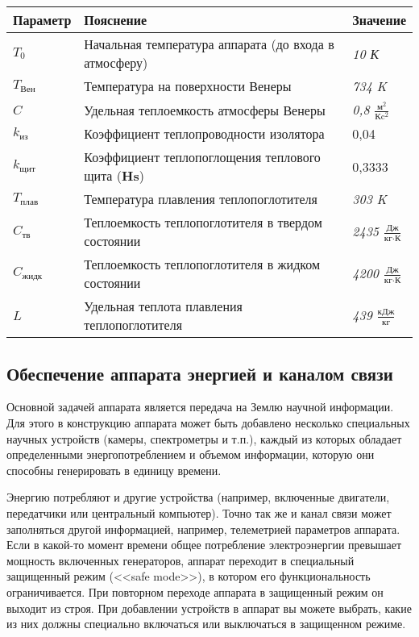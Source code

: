 \documentclass[12pt,a4paper]{article}
\begin{document}
\begin{center}
\begin{tabular}{ |p{2cm}|p{8cm}|p{3cm}| } 
  \hline
  \textbf{Параметр} & \textbf{Пояснение} & \textbf{Значение} \\
  \hline
  $ T_0 $ & Начальная температура аппарата (до входа в атмосферу) & \emph{10 К} \\
  \hline
  $ T_{\text{Вен}} $ & Температура на поверхности Венеры & \emph{734 K} \\
  \hline
  $ C $ & Удельная теплоемкость атмосферы Венеры & \emph{0,8 $\frac{\text{м}^2}{\text{К}
      \text{c}^2}$} \\
  \hline
  $ k_{\text{из}} $ & Коэффициент теплопроводности изолятора & 0,04\\
  \hline
  $ k_{\text{щит}} $ & Коэффициент теплопоглощения теплового щита (\textbf{Hs}) & 0,3333\\
  \hline
  $ T_{\text{плав}} $ & Температура плавления теплопоглотителя & \emph{303 K}\\
  \hline
  $ C_{\text{тв}}$ & Теплоемкость теплопоглотителя в твердом состоянии & \emph{2435
    $\frac{\text{Дж}}{\text{кг} \cdot \text{К}}$}\\
  \hline
  $ C_{\text{жидк}}$ & Теплоемкость теплопоглотителя в жидком состоянии & \emph{4200
    $\frac{\text{Дж}}{\text{кг} \cdot \text{К}}$}\\
  \hline
  $ L $ & Удельная теплота плавления теплопоглотителя & \emph{439 $\frac{\text{кДж}}{\text{кг}}$} \\
  \hline
\end{tabular}
\end{center}

\subsection{Обеспечение аппарата энергией и каналом связи}

Основной задачей аппарата является передача на Землю научной информации. Для этого в
конструкцию аппарата может быть добавлено несколько специальных научных устройств (камеры,
спектрометры и т.п.), каждый из которых обладает определенными энергопотреблением и
объемом информации, которую они способны генерировать в единицу времени.

Энергию потребляют и другие устройства (например, включенные двигатели, передатчики или
центральный компьютер). Точно так же и канал связи может заполняться другой информацией,
например, телеметрией параметров аппарата. Если в какой-то момент времени общее
потребление электроэнергии превышает мощность включенных генераторов, аппарат переходит в
специальный защищенный режим (<<safe mode>>), в котором его функциональность
ограничивается. При повторном переходе аппарата в защищенный режим он выходит из
строя. При добавлении устройств в аппарат вы можете выбрать, какие из них должны
специально включаться или выключаться в защищенном режиме.
\end{document}
